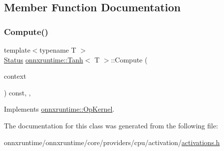 \subsection{Member Function Documentation}
\mbox{\label{classonnxruntime_1_1Tanh_af6256a08ee59334b61d4a6790d34e698}} 
\subsubsection{\texorpdfstring{Compute()}{Compute()}}
{\footnotesize\ttfamily template$<$typename T $>$ \\
\mbox{\hyperlink{classonnxruntime_1_1common_1_1Status}{Status}} \mbox{\hyperlink{classonnxruntime_1_1Tanh}{onnxruntime\+::\+Tanh}}$<$ T $>$\+::Compute (\begin{DoxyParamCaption}\item[{\mbox{\hyperlink{classonnxruntime_1_1OpKernelContext}{Op\+Kernel\+Context}} $\ast$}]{context }\end{DoxyParamCaption}) const\hspace{0.3cm}{\ttfamily [inline]}, {\ttfamily [override]}, {\ttfamily [virtual]}}



Implements \mbox{\hyperlink{classonnxruntime_1_1OpKernel_a9eca8656a78b1b3ab9d3351a12798650}{onnxruntime\+::\+Op\+Kernel}}.



The documentation for this class was generated from the following file\+:\begin{DoxyCompactItemize}
\item 
onnxruntime/onnxruntime/core/providers/cpu/activation/\mbox{\hyperlink{cpu_2activation_2activations_8h}{activations.\+h}}\end{DoxyCompactItemize}
